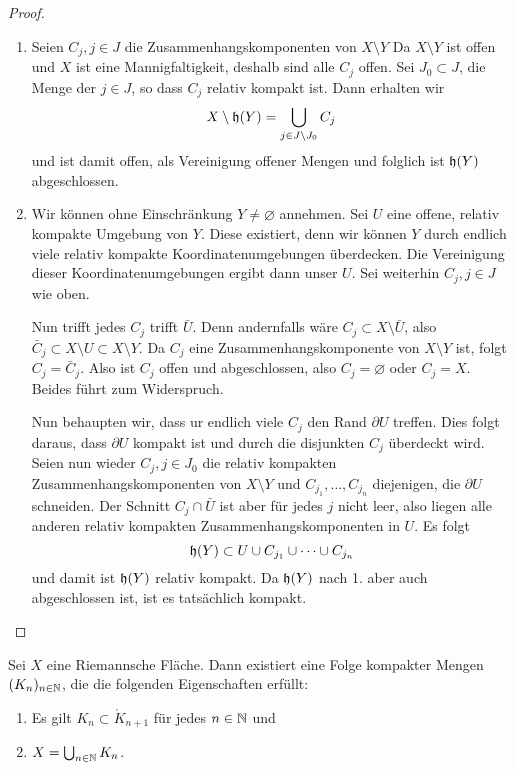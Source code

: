 \begin{proof}
  \begin{enumerate}
  \item Seien $C_j, j \in J$ die Zusammenhangskomponenten von $X
    \setminus Y$ Da $X \setminus Y$ ist offen und $X$ ist eine
    Mannigfaltigkeit, deshalb sind alle $C_j$ offen. Sei $J_0 \subset
    J$, die Menge der $j \in J$, so dass $C_j$ relativ kompakt
    ist. Dann erhalten wir
    \[
    X \setminus \mathfrak{h}(Y) = \bigcup_{j \in J\setminus J_0} C_j
    \]
    und ist damit offen, als Vereinigung offener Mengen und folglich
    ist $\mathfrak{h}(Y)$ abgeschlossen.
  \item Wir können ohne Einschränkung $Y \neq \varnothing$
    annehmen. Sei $U$ eine offene, relativ kompakte Umgebung von
    $Y$. Diese existiert, denn wir können $Y$ durch endlich viele
    relativ kompakte Koordinatenumgebungen überdecken. Die Vereinigung
    dieser Koordinatenumgebungen ergibt dann unser $U$. Sei weiterhin
    $C_j, j\in J$ wie oben.

    Nun trifft jedes $C_j$ trifft $\bar U$. Denn andernfalls wäre $C_j
    \subset X \setminus \bar U$, also $\bar C_j
    \subset X \setminus U \subset X \setminus Y$. Da $C_j$ eine
    Zusammenhangskomponente von $X \setminus Y$ ist, folgt $C_j =
    \bar C_j$. Also ist $C_j$ offen und abgeschlossen, also $C_j =
    \varnothing$ oder $C_j = X$. Beides führt zum Widerspruch.

    Nun behaupten wir, dass ur endlich viele $C_j$ den Rand $\partial
    U$ treffen. 
    Dies folgt daraus, dass $\partial U$ kompakt ist und durch die
    disjunkten $C_j$ überdeckt wird.
    Seien nun wieder $C_j, j \in J_0$ die relativ kompakten
    Zusammenhangskomponenten von $X \setminus Y$ und $C_{j_1}, \dots,
    C_{j_n}$ diejenigen, die $\partial U$ schneiden. Der Schnitt $C_j
    \cap \bar U$ ist aber für jedes $j$ nicht leer, also liegen alle
    anderen relativ kompakten Zusammenhangskomponenten in
    $U$. Es folgt
    \[
    \mathfrak{h}(Y) \subset U \cup C_{j_1} \cup \dots \cup C_{j_n}
    \]
    und damit ist $\mathfrak{h}(Y)$ relativ kompakt. Da $\mathfrak{h}(Y)$ nach 1. aber auch
    abgeschlossen ist, ist es tatsächlich kompakt.
  \end{enumerate}
\end{proof}


\begin{thm}
  \label{thm:kompakte-ausschöpfung}
  Sei $X$ eine Riemannsche Fläche. Dann existiert eine Folge kompakter Mengen
  $(K_n)_{n \in \mathbb{N}}$, die die folgenden Eigenschaften erfüllt:
  \begin{enumerate}
  \item Es gilt $K_n \subset \mathring K_{n+1}$ für jedes $n \in \mathbb{N}$ und
  \item $X = \bigcup_{n \in \mathbb{N}} K_n$.
  \end{enumerate}
\end{thm}

